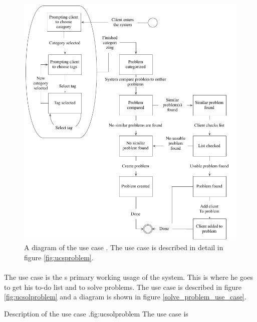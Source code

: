 \begin{figure}[htbp]
\begin{center}
 \includegraphics[scale=1]{input/application_domain_analysis/submit_problem_use_case}
\caption{A diagram of the use case \ucsproblem{}. The use case is described in detail in figure \ref{fig:ucsproblem}.}
\label{fig:submit_problem_use_case}
\end{center}
\end{figure}



\paragraph{\ucsolproblem{}} The use case \ucsolproblem{} is the \astaff{}s primary working usage of the system. This is where he goes to get his to-do list and to solve problems. The use case is described in figure \ref{fig:ucsolproblem} and a diagram is shown in figure \ref{solve_problem_use_case}.


\begin{sadlist}[h]{\ucsolproblem[c]}{Description of the use case \ucsolproblem{}.}{fig:ucsolproblem}
 The use case is 
\end{sadlist}

